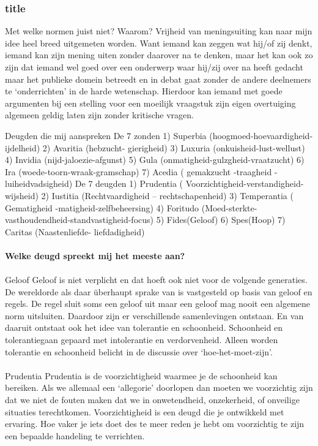 \documentclass[11pt]{report}
\begin{document}
\subsubsection{title}
Met welke normen juist niet? Waarom? 
Vrijheid van meningsuiting kan naar mijn idee heel breed uitgemeten worden. Want iemand kan zeggen wat hij/of zij denkt, iemand kan zijn mening uiten zonder daarover na te denken, maar het kan ook zo zijn dat iemand wel goed over een onderwerp waar hij/zij over na heeft gedacht maar het publieke domein betreedt en in debat gaat zonder de andere deelnemers te ‘onderrichten’ in de harde wetenschap. Hierdoor kan iemand met goede argumenten bij een stelling voor een moeilijk vraagstuk zijn eigen overtuiging algemeen geldig laten zijn zonder kritische vragen.

Deugden die mij aanspreken
De 7 zonden
1) Superbia (hoogmoed-hoevaardigheid-ijdelheid)
2) Avaritia (hebzucht- gierigheid)
3) Luxuria (onkuisheid-lust-wellust)
4) Invidia (nijd-jaloezie-afgunst)
5) Gula (onmatigheid-gulzgheid-vraatzucht)
6) Ira (woede-toorn-wraak-gramschap)
7) Acedia ( gemakzucht -traagheid -luiheidvadsigheid)
De 7 deugden
1) Prudentia ( Voorzichtigheid-verstandigheid-wijsheid)
2) Iustitia (Rechtvaardigheid – rechtschapenheid)
3) Temperantia ( Gematigheid -matigheid-zelfbeheersing)
4) Foritudo (Moed-sterkte-vasthoudendheid-standvastigheid-focus)
5) Fides(Geloof)
6) Spes(Hoop)
7) Caritas (Naastenliefde- liefdadigheid)


\paragraph{Welke deugd spreekt mij het meeste aan?}
\paragraph{}
Geloof
Geloof is niet verplicht en dat hoeft ook niet voor de volgende generaties. De wereldorde als daar überhaupt sprake van is vastgesteld op basis van geloof en regels. De regel sluit soms een geloof uit maar een geloof mag nooit een algemene norm uitsluiten. Daardoor zijn er verschillende samenlevingen ontstaan. En van daaruit ontstaat ook het idee van tolerantie en schoonheid. Schoonheid en tolerantiegaan gepaard met intolerantie en verdorvenheid. Alleen worden tolerantie en schoonheid belicht in de discussie over ‘hoe-het-moet-zijn’.
\paragraph{}
Prudentia
Prudentia is de voorzichtigheid waarmee je de schoonheid kan bereiken. Als we allemaal een ‘allegorie’ doorlopen dan moeten we voorzichtig zijn dat we niet de fouten maken dat we in onwetendheid, onzekerheid, of onveilige situaties terechtkomen. Voorzichtigheid is een deugd die je ontwikkeld met ervaring. Hoe vaker je iets doet des te meer reden je hebt om voorzichtig te zijn een bepaalde handeling te verrichten.
\end{document}
